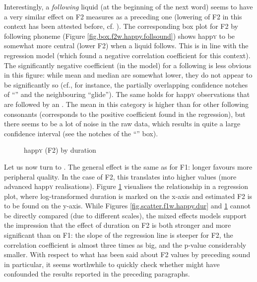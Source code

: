 Interestingly, a \emph{following} liquid (at the beginning of the next word) seems to have a very similar effect on F2 measures as a preceding one (lowering of F2 in this context has been attested before, cf. \textcite[26]{lehiste1964}).
The corresponding box plot for F2 by following phoneme (Figure \ref{fig.box.f2w.happy.follsound}) shows happ\textsc{y} to be somewhat more central (lower F2) when a liquid follows.
This is in line with the regression model (which found a negative correlation coefficient for this context).
The significantly negative coefficient (in the model) for a following  is less obvious in this figure: while mean and median are somewhat lower, they do not appear to be significantly so (cf., for instance, the partially overlapping confidence notches of ``'' and the neighbouring ``glide'').
The same holds for happ\textsc{y} observations that are followed by an .
The mean in this category is higher than for other following consonants (corresponds to the positive coefficient found in the regression), but there seems to be a lot of noise in the raw data, which results in quite a large confidence interval (see the notches of the ``'' box).

\begin{figure}[h!]
	\centering
		\resizebox{0.5\linewidth}{!}{} 
	\caption{happ\textsc{y} (F2) by duration}
	\label{fig.scatter.f2w.happy.dur}
\end{figure}

Let us now turn to .
The general effect is the same as for F1: longer  favours more peripheral  quality.
In the case of F2, this translates into higher values (more advanced happ\textsc{y} realisations).
Figure \ref{fig.scatter.f2w.happy.dur} visualises the relationship in a regression plot, where log-transformed duration is marked on the x-axis and estimated F2 is to be found on the y-axis.
While Figures \ref{fig.scatter.f1w.happy.dur} and \ref{fig.scatter.f2w.happy.dur} cannot be directly compared (due to different scales), the mixed effects models support the impression that the effect of duration on F2 is both stronger and more significant than on F1: the slope of the regression line is steeper for F2, the correlation coefficient is almost three times as big, and the p-value considerably smaller.
With respect to what has been said about F2 values by preceding sound in particular, it seems worthwhile to quickly check whether  might have confounded the results reported in the preceding paragraphs.


